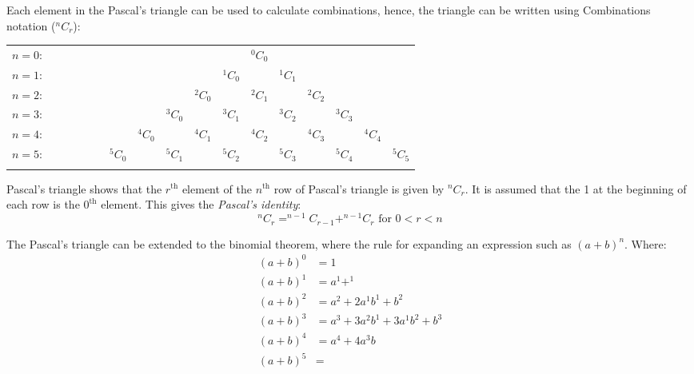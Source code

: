 \documentclass[a4paper,10pt]{report}
\begin{document}
		Each element in the Pascal's triangle can be used to calculate combinations, hence, the triangle can be written using Combinations notation ($^nC_r$):
		\begin{center}
			\begin{tabular}{rcccccccccccccccc}
				$n=0$:&    &    &    &    &    &    &    &    &    &    &  $^0C_0$\\\noalign{\smallskip\smallskip}
				$n=1$:&    &    &    &    &    &    &    &    &    &  $^1C_0$ &    &  $^1C_1$\\\noalign{\smallskip\smallskip}
				$n=2$:&    &    &    &    &    &    &    &    &  $^2C_0$ &    &  $^2C_1$ &    &  $^2C_2$\\\noalign{\smallskip\smallskip}
				$n=3$:&    &    &    &    &    &    &    &  $^3C_0$ &    &  $^3C_1$ &    &  $^3C_2$ &    &  $^3C_3$\\\noalign{\smallskip\smallskip}
				$n=4$:&    &    &    &    &    &    &  $^4C_0$ &    &  $^4C_1$ &    &  $^4C_2$ &    &  $^4C_3$ &    &  $^4C_4$\\\noalign{\smallskip\smallskip}
				$n=5$:&    &    &    &    &    &  $^5C_0$ &    &  $^5C_1$ &    & $^5C_2$ &    & $^5C_3$ &    &  $^5C_4$ &    &  $^5C_5$\\\noalign{\smallskip\smallskip}
			\end{tabular}
		\end{center}

		Pascal's triangle shows that the $r^\text{th}$ element of the $n^\text{th}$ row of Pascal's triangle is given by $^nC_r$.  It is assumed that the 1 at the beginning of each row is the $0^\text{th}$ element.  This gives the \emph{Pascal's identity}:
		$$^nC_r = ^{n-1}C_{r-1} + ^{n-1}C_r \text{ for } 0 < r < n$$

		The Pascal's triangle can be extended to the binomial theorem, where the rule for expanding an expression such as $(a + b)^n$.  Where:
		\begin{align*}
			(a + b)^ 0 &= 1\\
			(a + b)^ 1 &= a^1 + ^1\\
			(a + b)^ 2 &= a^2 + 2a^1b^1 + b^2\\
			(a + b)^ 3 &= a^3 + 3a^2b^1 + 3a^1b^2 + b^3\\
			(a + b)^ 4 &= a^4 + 4a^3b\\
			(a + b)^ 5 &= \\
		\end{align*}


	
	
\end{document}
